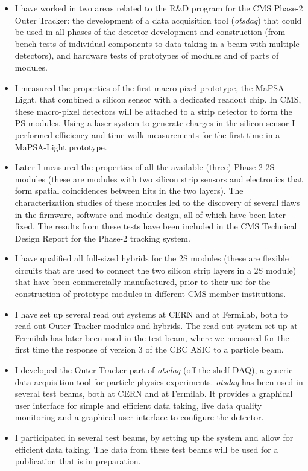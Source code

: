 \documentclass[]{cv} %
\begin{document}
\begin{resume}
\begin{itemize}
  \item I have worked in two areas related to the R\&D program for the CMS
        Phase-2 Outer Tracker: the development of a data acquisition tool
        (\textit{otsdaq}) that could be used in all phases of the detector
        development and construction (from bench tests of individual components
        to data taking in a beam with multiple detectors), and hardware tests of
        prototypes of modules and of parts of modules.
  \item I measured the properties of the first macro-pixel prototype, the
        MaPSA-Light, that combined a silicon sensor with a dedicated readout
        chip. In CMS, these macro-pixel detectors will be attached to a strip
        detector to form the PS modules. Using a laser system to generate
        charges in the silicon sensor I performed efficiency and time-walk
        measurements for the first time in a MaPSA-Light prototype.
  \item Later I measured the properties of all the available (three) Phase-2 2S
        modules (these are modules with two silicon strip sensors and
        electronics that form spatial coincidences between hits in the two
        layers). The characterization studies of these modules led to the
        discovery of several flaws in the firmware, software and module design,
        all of which have been later fixed. The results from these tests have
        been included in the CMS Technical Design Report for the Phase-2
        tracking system.
  \item I have qualified all full-sized hybrids for the 2S modules (these are
        flexible circuits that are used to connect the two silicon strip layers
        in a 2S module) that have been commercially manufactured, prior to their
        use for the construction of prototype modules in different CMS member
        institutions.
  \item I have set up several read out systems at CERN and at Fermilab, both to
        read out Outer Tracker modules and hybrids. The read out system set up
        at Fermilab has later been used in the test beam, where we measured for
        the first time the response of version 3 of the CBC ASIC to a particle
        beam.
  \item I developed the Outer Tracker part of \textit{otsdaq} (off-the-shelf
        DAQ), a generic data acquisition tool for particle physics experiments.
        \textit{otsdaq} has been used in several test beams, both at CERN and at
        Fermilab. It provides a graphical user interface for simple and
        efficient data taking, live data quality monitoring and a graphical user
        interface to configure the detector.
  \item I participated in several test beams, by setting up the system and allow
        for efficient data taking. The data from these test beams will be used
        for a publication that is in preparation.
\end{itemize}

\end{resume}
\fi
\end{document}
